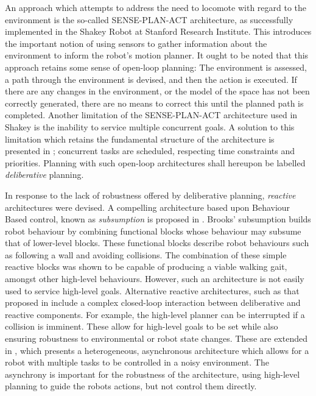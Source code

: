 An approach which attempts to address the need to locomote with regard to the environment is the so-called SENSE-PLAN-ACT architecture, as successfully implemented in the Shakey Robot at Stanford Research Institute\cite{shakey1968}. This introduces the important notion of using sensors to gather information about the environment to inform the robot's motion planner.  It ought to be noted that this approach retains some sense of open-loop planning: The environment is assessed, a path through the environment is devised, and then the action is executed. If there are any changes in the environment, or the model of the space has not been correctly generated, there are no means to correct this until the planned path is completed. Another limitation of the SENSE-PLAN-ACT architecture used in Shakey is the inability to service multiple concurrent goals. A solution to this limitation which retains the fundamental structure of the architecture is presented in \cite{vere1983planning}; concurrent tasks are scheduled, respecting time constraints and priorities. Planning with such open-loop architectures shall hereupon be labelled \textit{deliberative} planning.

In response to the lack of robustness offered by deliberative planning, \textit{reactive} architectures were devised. A compelling architecture based upon Behaviour Based control, known as \textit{subsumption} is proposed in \cite{brooks1986robust}. Brooks' subsumption builds robot behaviour by combining functional blocks whose behaviour may subsume that of lower-level blocks. These functional blocks describe robot behaviours such as following a wall and avoiding collisions. The combination of these simple reactive blocks was shown to be capable of producing a viable walking gait, amongst other high-level behaviours. However, such an architecture is not easily used to service high-level goals. Alternative reactive architectures, such as that proposed in \cite{georgeff1987reactive} include a complex closed-loop interaction between deliberative and reactive components. For example, the high-level planner can be interrupted if a collision is imminent. These allow for high-level goals to be set while also ensuring robustness to environmental or robot state changes. These are extended in \cite{gat1992integrating}, which presents a heterogeneous, asynchronous architecture which allows for a robot with multiple tasks to be controlled in a noisy environment. The asynchrony is important for the robustness of the architecture, using high-level planning to guide the robots actions, but not control them directly. 

